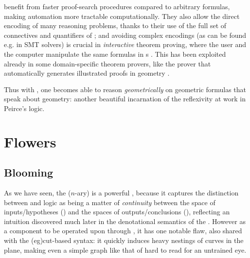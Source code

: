 \begin{scope}
\begin{description}
  \itemAP[Automation]  benefit from faster proof-search
  procedures compared to arbitrary formulas, making automation more tractable
  computationally. They also allow the direct encoding of many reasoning
  problems, thanks to their use of the full set of connectives and quantifiers
  of ; and avoiding complex encodings (as can be found e.g. in SMT
  solvers) is crucial in \emph{interactive} theorem proving, where the user and
  the computer manipulate the same formulas in s
  . This has been exploited already in some
  domain-specific theorem provers, like the  prover that
  automatically generates illustrated proofs in geometry
  .
  
  \begin{remark}
  Thus with , one becomes able to reason \emph{geometrically} on geometric
  formulas that speak about geometry: another beautiful incarnation of the
  reflexivity at work in Peirce's  logic.
  \end{remark}
\end{description}

\section{Flowers}

\subsection{Blooming}

As we have seen, the ($n$-ary)  is a powerful
, because it captures the distinction between  and
 logic as being a matter of \emph{continuity} between the
space of inputs/hypotheses () and the spaces of outputs/conclusions
(), reflecting an intuition discovered much later in the denotational
semantics of the . However as a 
component to be operated upon through , it has one
notable flaw, also shared with the  \kl(eg){cut}-based syntax: it
quickly induces heavy nestings of curves in the plane, making even a simple
graph like that of  hard to read for an untrained eye.


\end{scope}
